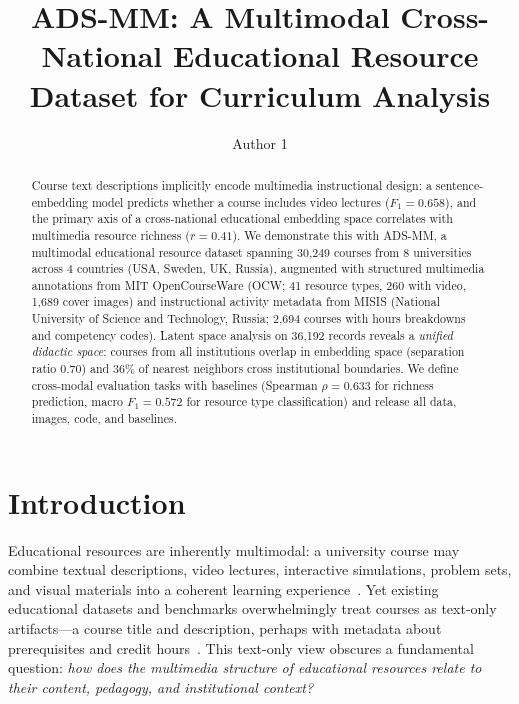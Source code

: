 \documentclass[sigconf,review]{acmart}
\title{ADS-MM: A Multimodal Cross-National Educational Resource Dataset for Curriculum Analysis}
\author{Author 1}
\affiliation{%
  \institution{University}
  \city{City}
  \country{Country}
}
\newcommand{\NumUniversities}{8}
\newcommand{\NumCountries}{4}
\newcommand{\NumCourses}{30,249}
\newcommand{\NumMISIS}{2,694}
\newcommand{\NumOCWVideo}{260}            %
\newcommand{\NumResourceTypes}{41}        %
\newcommand{\SBERTRichnessRho}{0.633}
\newcommand{\SBERTMacroF}{0.572}
\newcommand{\SBERTVideoF}{0.658}
\newcommand{\NumImages}{1,689}            %
\newcommand{\ADSMM}{\textsc{ADS-MM}\xspace}
\begin{document}
\begin{abstract}
Course text descriptions implicitly encode multimedia instructional design: a sentence-embedding model predicts whether a course includes video lectures ($F_1{=}{\SBERTVideoF}$), and the primary axis of a cross-national educational embedding space correlates with multimedia resource richness ($r{=}0.41$).
We demonstrate this with \ADSMM, a multimodal educational resource dataset spanning {\NumCourses} courses from {\NumUniversities} universities across {\NumCountries} countries (USA, Sweden, UK, Russia), augmented with structured multimedia annotations from MIT OpenCourseWare (OCW; {\NumResourceTypes} resource types, {\NumOCWVideo} with video, {\NumImages} cover images) and instructional activity metadata from MISIS (National University of Science and Technology, Russia; {\NumMISIS} courses with hours breakdowns and competency codes).
Latent space analysis on 36{,}192 records reveals a \emph{unified didactic space}: courses from all institutions overlap in embedding space (separation ratio 0.70) and 36\% of nearest neighbors cross institutional boundaries.
We define cross-modal evaluation tasks with baselines (Spearman $\rho{=}{\SBERTRichnessRho}$ for richness prediction, macro $F_1{=}{\SBERTMacroF}$ for resource type classification) and release all data, images, code, and baselines.
\end{abstract}

\maketitle


\section{Introduction}
\label{sec:intro}

Educational resources are inherently multimodal: a university course may combine textual descriptions, video lectures, interactive simulations, problem sets, and visual materials into a coherent learning experience~\cite{mayer2009multimedia,wang2024llmedu}.
Yet existing educational datasets and benchmarks overwhelmingly treat courses as text-only artifacts---a course title and description, perhaps with metadata about prerequisites and credit hours~\cite{morsy2019course2vec,yu2023mooccubex,dasilva2022slrERS}.
This text-only view obscures a fundamental question: \emph{how does the multimedia structure of educational resources relate to their content, pedagogy, and institutional context?}
\end{document}
